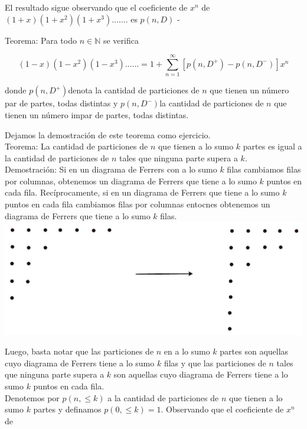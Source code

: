 \documentclass[10pt]{article}
\begin{document}
El resultado sigue observando que el coeficiente de $x^{n}$ de $(1+x)\left(1+x^{2}\right)\left(1+x^{3}\right) \ldots \ldots$. es $p(n, D)$ -

Teorema: Para todo $n \in \mathbb{N}$ se verifica

$$
(1-x)\left(1-x^{2}\right)\left(1-x^{3}\right) \ldots \ldots=1+\sum_{n=1}^{\infty}\left[p\left(n, D^{+}\right)-p\left(n, D^{-}\right)\right] x^{n}
$$

donde $p\left(n, D^{+}\right)$denota la cantidad de particiones de $n$ que tienen un número par de partes, todas distintas y $p\left(n, D^{-}\right)$la cantidad de particiones de $n$ que tienen un número impar de partes, todas distintas.

Dejamos la demostración de este teorema como ejercicio.\\
Teorema: La cantidad de particiones de $n$ que tienen a lo sumo $k$ partes es igual a la cantidad de particiones de $n$ tales que ninguna parte supera a $k$.\\
Demostración: Si en un diagrama de Ferrers con a lo sumo $k$ filas cambiamos filas por columnas, obtenemos un diagrama de Ferrers que tiene a lo sumo $k$ puntos en cada fila. Recíprocamente, si en un diagrama de Ferrers que tiene a lo sumo $k$ puntos en cada fila cambiamos filas por columnas entocnes obtenemos un diagrama de Ferrers que tiene a lo sumo $k$ filas.\\
\includegraphics[max width=\textwidth, center]{2025_09_05_3ba26226ec0baddb5a03g-33}

Luego, basta notar que las particiones de $n$ en a lo sumo $k$ partes son aquellas cuyo diagrama de Ferrers tiene a lo sumo $k$ filas y que las particiones de $n$ tales que ninguna parte supera a $k$ son aquellas cuyo diagrama de Ferrers tiene a lo sumo $k$ puntos en cada fila.\\
Denotemos por $p(n, \leq k)$ a la cantidad de particiones de $n$ que tienen a lo sumo $k$ partes y definamos $p(0, \leq k)=1$. Observando que el coeficiente de $x^{n}$ de
\end{document}
